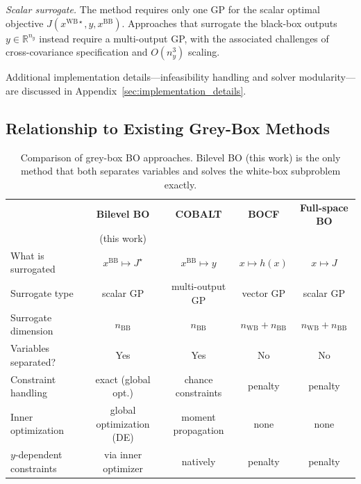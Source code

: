 \documentclass[12pt,a4paper]{article}%
\theoremstyle{plain}%
\theoremstyle{remark}%
\theoremstyle{definition}%
\def\WB{\mathrm{WB}}
\def\BB{\mathrm{BB}}
\begin{document}
\emph{Scalar surrogate.} The method requires only one GP for the scalar optimal objective $J(x^{\WB\star}, y, x^{\BB})$. Approaches that surrogate the black-box outputs $y \in \mathbb{R}^{n_y}$ instead require a multi-output GP, with the associated challenges of cross-covariance specification and $O(n_y^3)$ scaling.

Additional implementation details---infeasibility handling and solver modularity---are discussed in Appendix~\ref{sec:implementation_details}.

\subsection{Relationship to Existing Grey-Box Methods}\label{subsec:contrast_greybox_approaches}

\begin{table}[htbp]
\centering
\caption{Comparison of grey-box BO approaches. Bilevel BO (this work) is the only method that both separates variables and solves the white-box subproblem exactly.}
\label{tab:method_comparison}
\begin{tabular}{@{}lcccc@{}}
\toprule
& \textbf{Bilevel BO} & \textbf{COBALT} & \textbf{BOCF} & \textbf{Full-space BO} \\
& (this work) & \cite{paulson2022cobalt} & \cite{astudillo2019bocf} & \\
\midrule
What is surrogated & $x^{\BB} \mapsto J^\star$ & $x^{\BB} \mapsto y$ & $x \mapsto h(x)$ & $x \mapsto J$ \\
Surrogate type & scalar GP & multi-output GP & vector GP & scalar GP \\
Surrogate dimension & $n_{\BB}$ & $n_{\BB}$ & $n_{\WB}+n_{\BB}$ & $n_{\WB}+n_{\BB}$ \\
Variables separated? & Yes & Yes & No & No \\
Constraint handling & exact (global opt.) & chance constraints & penalty & penalty \\
Inner optimization & global optimization (DE) & moment propagation & none & none \\
$y$-dependent constraints & via inner optimizer & natively & penalty & penalty \\
\bottomrule
\end{tabular}
\end{table}
\end{document}
